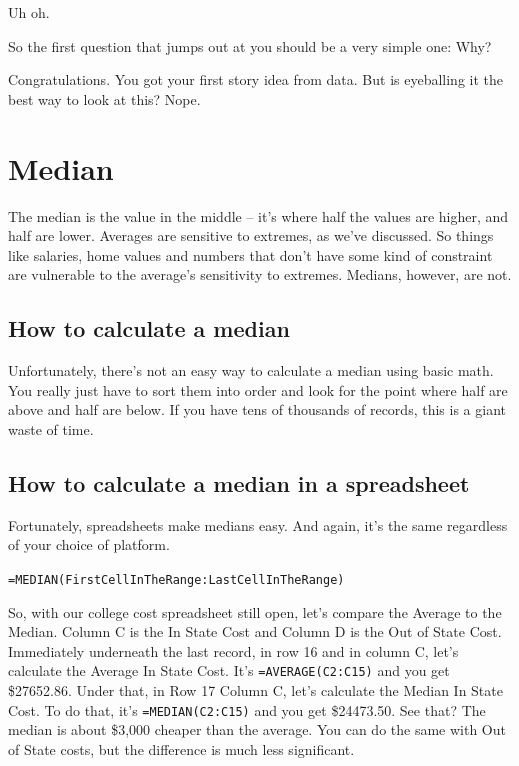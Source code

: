 \documentclass[
]{book}
\begin{document}
Uh oh.

So the first question that jumps out at you should be a very simple one: Why?

Congratulations. You got your first story idea from data. But is eyeballing it the best way to look at this? Nope.

\hypertarget{median}{%
\chapter{Median}\label{median}}

The median is the value in the middle -- it's where half the values are higher, and half are lower. Averages are sensitive to extremes, as we've discussed. So things like salaries, home values and numbers that don't have some kind of constraint are vulnerable to the average's sensitivity to extremes. Medians, however, are not.

\hypertarget{how-to-calculate-a-median}{%
\section{How to calculate a median}\label{how-to-calculate-a-median}}

Unfortunately, there's not an easy way to calculate a median using basic math. You really just have to sort them into order and look for the point where half are above and half are below. If you have tens of thousands of records, this is a giant waste of time.

\hypertarget{how-to-calculate-a-median-in-a-spreadsheet}{%
\section{How to calculate a median in a spreadsheet}\label{how-to-calculate-a-median-in-a-spreadsheet}}

Fortunately, spreadsheets make medians easy. And again, it's the same regardless of your choice of platform.

\texttt{=MEDIAN(FirstCellInTheRange:LastCellInTheRange)}

So, with our college cost spreadsheet still open, let's compare the Average to the Median. Column C is the In State Cost and Column D is the Out of State Cost. Immediately underneath the last record, in row 16 and in column C, let's calculate the Average In State Cost. It's \texttt{=AVERAGE(C2:C15)} and you get \$27652.86. Under that, in Row 17 Column C, let's calculate the Median In State Cost. To do that, it's \texttt{=MEDIAN(C2:C15)} and you get \$24473.50. See that? The median is about \$3,000 cheaper than the average. You can do the same with Out of State costs, but the difference is much less significant.
\end{document}
